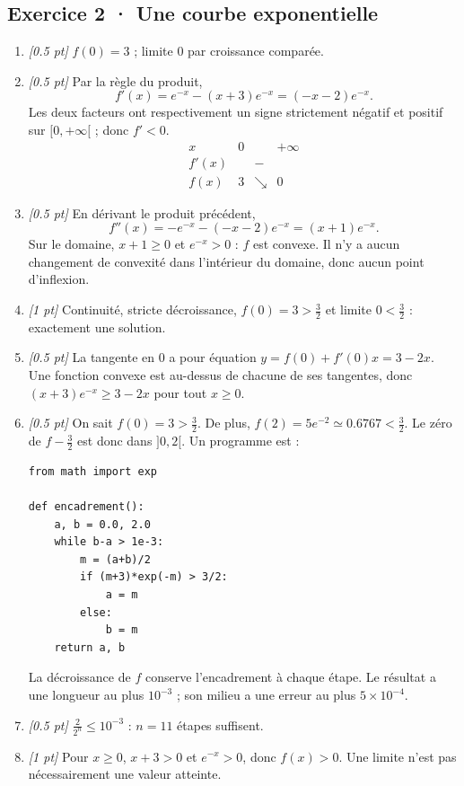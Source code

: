 \subsection*{Exercice 2 · Une courbe exponentielle}\begin{enumerate}

\item \textit{[\num{0,5} pt]} $f(0)=3$ ; limite $0$ par croissance comparée.

\item \textit{[\num{0,5} pt]} Par la règle du produit,
\[f'(x)=e^{-x}-(x+3)e^{-x}=(-x-2)e^{-x}.\]
Les deux facteurs ont respectivement un signe strictement négatif et positif sur $[0,+\infty[$ ; donc $f'<0$.
\[\begin{array}{c|ccc}x&0&&+\infty\\\hline f'(x)&&-&\\\hline f(x)&3&\searrow&0\end{array}\]

\item \textit{[\num{0,5} pt]} En dérivant le produit précédent,
\[f''(x)=-e^{-x}-(-x-2)e^{-x}=(x+1)e^{-x}.\]
Sur le domaine, $x+1\ge0$ et $e^{-x}>0$ : $f$ est convexe. Il n'y a aucun changement de convexité dans l'intérieur du domaine, donc aucun point d'inflexion.

\item \textit{[1 pt]} Continuité, stricte décroissance, $f(0)=3>\frac{3}{2}$ et limite $0<\frac{3}{2}$ : exactement une solution.

\item \textit{[\num{0,5} pt]} La tangente en $0$ a pour équation $y=f(0)+f'(0)x=3-2x$. Une fonction convexe est au-dessus de chacune de ses tangentes, donc $(x+3)e^{-x}\ge 3-2x$ pour tout $x\ge0$.


\item \textit{[\num{0,5} pt]} On sait $f(0)=3>\frac{3}{2}$. De plus, $f(2)=5e^{-2}\simeq\num{0,6767}<\frac{3}{2}$. Le zéro de $f-\frac{3}{2}$ est donc dans $]0,2[$. Un programme est :
\begin{lstlisting}
from math import exp

def encadrement():
    a, b = 0.0, 2.0
    while b-a > 1e-3:
        m = (a+b)/2
        if (m+3)*exp(-m) > 3/2:
            a = m
        else:
            b = m
    return a, b
\end{lstlisting}
La décroissance de $f$ conserve l'encadrement à chaque étape. Le résultat a une longueur au plus $10^{-3}$ ; son milieu a une erreur au plus $5\times10^{-4}$.

\item \textit{[\num{0,5} pt]} $\frac{2}{2^n}\le10^{-3}$ : $n=11$ étapes suffisent.

\item \textit{[1 pt]} Pour $x\ge0$, $x+3>0$ et $e^{-x}>0$, donc $f(x)>0$. Une limite n'est pas nécessairement une valeur atteinte.

\end{enumerate}

